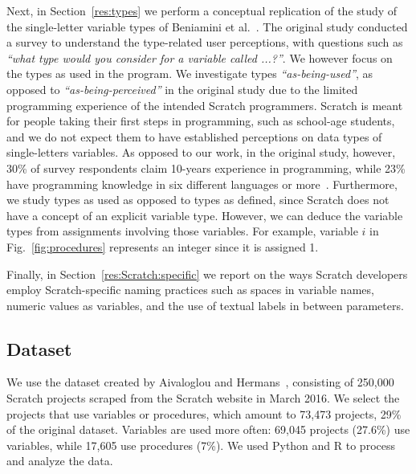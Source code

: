 \documentclass[conference]{IEEEtran}
\newcommand{\quotes}[1]{\textit{``#1''}}
\begin{document}
Next, in Section~\ref{res:types} we perform a conceptual replication of the study of the single-letter variable types of Beniamini et al.~\cite{Beniamini}. 
The original study conducted a survey to understand the type-related user perceptions, with questions such as \emph{``what type would you consider for a variable called ...?''}. We however focus on the types as used in the program. 
We investigate types \quotes{as-being-used}, as opposed to \quotes{as-being-perceived} in the original study due to the limited programming experience of the intended Scratch programmers.
Scratch is meant for people taking their first steps in programming, such as school-age students, and we do not expect them to have established  perceptions on data types of single-letters variables. 
As opposed to our work, in the original study, however, 30\% of survey respondents claim 10-years experience in programming, while  23\% have programming knowledge in six different languages or more~\cite{Beniamini}. 
Furthermore, we study types as used as opposed to types as defined, since Scratch does not have a concept of an explicit variable type.
However, we can deduce the variable types from assignments involving those variables. 
For example, variable $i$ in Fig.~\ref{fig:procedures} represents an integer since it is assigned 1. 


Finally, in Section~\ref{res:Scratch:specific} we report on the ways Scratch developers employ Scratch-specific naming practices such as spaces in variable names, numeric values as variables, and the use of textual labels in between parameters.

\subsection{Dataset}
We use the dataset created by Aivaloglou and Hermans~\cite{Aivaloglou2016HowKC}, consisting of 250,000 Scratch projects scraped from the Scratch website in March 2016. 
We select the projects that use variables or procedures, which amount to 73,473 projects, 29\% of the original dataset. 
Variables are used more often: 69,045 projects (27.6\%) use variables, while 17,605 use procedures (7\%). 
We used Python and R to process and analyze the data. 
\end{document}
